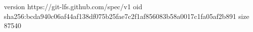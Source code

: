 version https://git-lfs.github.com/spec/v1
oid sha256:bcda940c06af44af138df075b25fae7c2f1af856083b58a0017c1fa05af2b891
size 87540
